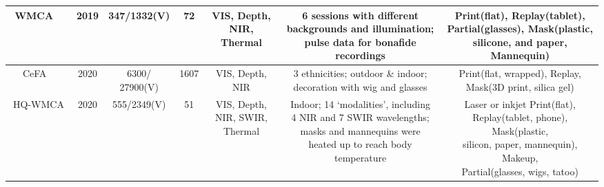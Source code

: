 \documentclass[10pt,journal,compsoc]{IEEEtran}
\begin{document}
\begin{table}
{\begin{tabular}{c c c c c c c}
 \midrule
WMCA
~\cite{george2019biometric} & 2019 & 347/1332(V) & 72 &  \tabincell{c}{VIS, Depth,\\ NIR, Thermal}  &  \tabincell{c}{6 sessions with different \\backgrounds and illumination; \\pulse data for bonafide recordings}  & \tabincell{c}{Print(flat), Replay(tablet),\\ Partial(glasses), Mask(plastic, \\silicone, and paper, Mannequin)}\\


 \midrule
CeFA
~\cite{li2020casia} & 2020 &   \tabincell{c}{6300/\\27900(V)} & 1607 & \tabincell{c}{VIS, Depth,\\NIR} &   \tabincell{c}{3 ethnicities; outdoor \& indoor;\\ decoration with wig and glasses} & \tabincell{c}{Print(flat, wrapped), Replay, \\Mask(3D print, silica gel)}\\


 \midrule
HQ-WMCA
~\cite{heusch2020deep} & 2020 &  555/2349(V) & 51 & \tabincell{c}{VIS, Depth, \\NIR, SWIR,\\Thermal} &   \tabincell{c}{Indoor; 14 `modalities', including \\4
NIR and 7 SWIR wavelengths; \\masks and mannequins were \\heated up to reach body temperature} & \tabincell{c}{Laser or inkjet  Print(flat), \\Replay(tablet, phone), Mask(plastic, \\silicon, paper, mannequin), Makeup,\\ Partial(glasses, wigs, tatoo)}\\



 \bottomrule[1pt]
 \end{tabular}}
\end{table}
\end{document}

